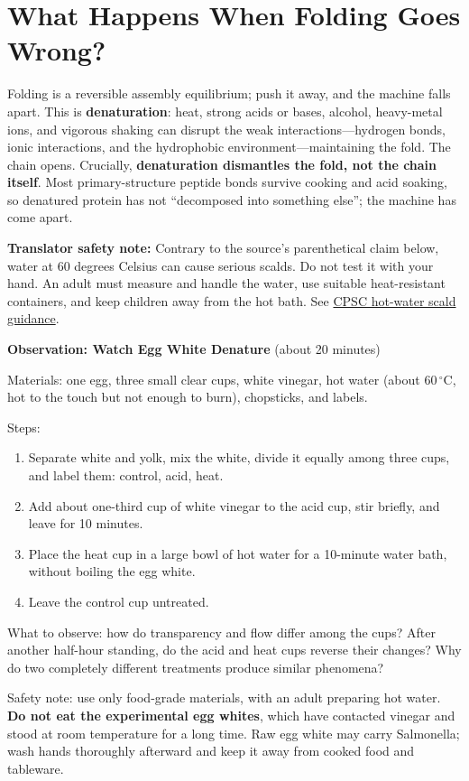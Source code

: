 \section{What Happens When Folding Goes Wrong?}

Folding is a reversible assembly equilibrium; push it away, and the machine falls apart. This is \textbf{denaturation}: heat, strong acids or bases, alcohol, heavy-metal ions, and vigorous shaking can disrupt the weak interactions---hydrogen bonds, ionic interactions, and the hydrophobic environment---maintaining the fold. The chain opens. Crucially, \textbf{denaturation dismantles the fold, not the chain itself}. Most primary-structure peptide bonds survive cooking and acid soaking, so denatured protein has not ``decomposed into something else''; the machine has come apart.

\textbf{Translator safety note:} Contrary to the source's parenthetical claim below, water at 60 degrees Celsius can cause serious scalds. Do not test it with your hand. An adult must measure and handle the water, use suitable heat-resistant containers, and keep children away from the hot bath. See \href{https://www.cpsc.gov/s3fs-public/5098.pdf}{CPSC hot-water scald guidance}.

\begin{shiyan}
\textbf{Observation: Watch Egg White Denature} (about 20 minutes)

Materials: one egg, three small clear cups, white vinegar, hot water (about $60\,^{\circ}\mathrm{C}$, hot to the touch but not enough to burn), chopsticks, and labels.

Steps:
\begin{enumerate}[itemsep=1pt]
\item Separate white and yolk, mix the white, divide it equally among three cups, and label them: control, acid, heat.
\item Add about one-third cup of white vinegar to the acid cup, stir briefly, and leave for 10 minutes.
\item Place the heat cup in a large bowl of hot water for a 10-minute water bath, without boiling the egg white.
\item Leave the control cup untreated.
\end{enumerate}

What to observe: how do transparency and flow differ among the cups? After another half-hour standing, do the acid and heat cups reverse their changes? Why do two completely different treatments produce similar phenomena?

Safety note: use only food-grade materials, with an adult preparing hot water. \textbf{Do not eat the experimental egg whites}, which have contacted vinegar and stood at room temperature for a long time. Raw egg white may carry Salmonella; wash hands thoroughly afterward and keep it away from cooked food and tableware.
\end{shiyan}

